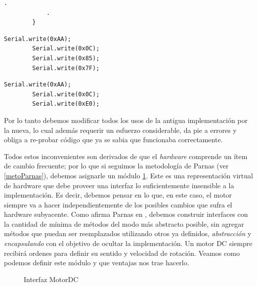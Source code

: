 \begin{itemize}
\begin{lstlisting}[caption=Configuración, label={listingDistinto}]
            .
            .
        }
    \end{lstlisting}
    \begin{lstlisting}[caption=Máxima velocidad giro horario]
        Serial.write(0xAA);
        Serial.write(0x0C);
        Serial.write(0x85);
        Serial.write(0x7F);
    \end{lstlisting}
    \begin{lstlisting}[caption=Detenerse]
        Serial.write(0xAA);
        Serial.write(0x0C);
        Serial.write(0xE0);
    \end{lstlisting}
    Por lo tanto debemos modificar todos los usos de la antigua implementación por la nueva, lo cual además requerir un esfuerzo considerable, da pie a errores y obliga a re-probar código que ya se sabia que funcionaba correctamente.
\end{itemize}

Todos estos inconvenientes son derivados de que el \textit{hardware} comprende un ítem de cambio frecuente; por lo que si seguimos la metodología de Parnas (ver \ref{metoParnas}), debemos asignarle un módulo \ref{interfazMotor}. Este es una representación virtual de hardware que debe proveer una interfaz lo suficientemente insensible a la implementación. Es decir, debemos pensar en lo que, en este caso, el motor siempre va a hacer independientemente de los posibles cambios que sufra el hardware subyacente. Como afirma Parnas en \cite{Parnas02, parnas1977abstract}, debemos construir interfaces con la cantidad de mínima de métodos del modo más abstracto posible, sin agregar métodos que puedan ser reemplazados utilizando otros ya definidos, \textit{abstracción} y \textit{encapsulando} con el objetivo de ocultar la implementación.
Un motor DC siempre recibirá ordenes para definir su sentido y velocidad de rotación. Veamos como podemos definir este módulo y que ventajas nos trae hacerlo.

\begin{figure}
\caption{Interfaz MotorDC}
\label{interfazMotor}
\begin{center}
\end{center}
\end{figure}


